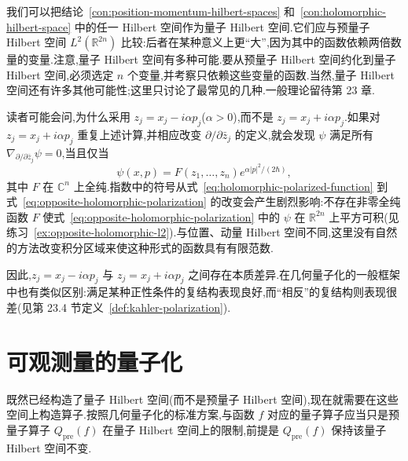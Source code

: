 我们可以把结论~\ref{con:position-momentum-hilbert-spaces} 和~\ref{con:holomorphic-hilbert-space} 中的任一 Hilbert 空间作为量子 Hilbert 空间.它们应与预量子 Hilbert 空间 $L^2(\mathbb R^{2n})$ 比较:后者在某种意义上更“大”,因为其中的函数依赖两倍数量的变量.注意,量子 Hilbert 空间有多种可能.要从预量子 Hilbert 空间约化到量子 Hilbert 空间,必须选定 $n$ 个变量,并考察只依赖这些变量的函数.当然,量子 Hilbert 空间还有许多其他可能性;这里只讨论了最常见的几种.一般理论留待第 23 章.

读者可能会问,为什么采用 $z_j=x_j-i\alpha p_j$($\alpha>0$),而不是 $z_j=x_j+i\alpha p_j$.如果对 $z_j=x_j+i\alpha p_j$ 重复上述计算,并相应改变 $\partial/\partial\bar z_j$ 的定义,就会发现 $\psi$ 满足所有 $\nabla_{\partial/\partial\bar z_j}\psi=0$,当且仅当
\[
 \psi(x,p)=F(z_1,\ldots,z_n)e^{\alpha|p|^2/(2\hbar)},
 \label{eq:opposite-holomorphic-polarization}
\]
其中 $F$ 在 $\mathbb C^n$ 上全纯.指数中的符号从式~\eqref{eq:holomorphic-polarized-function} 到式~\eqref{eq:opposite-holomorphic-polarization} 的改变会产生剧烈影响:不存在非零全纯函数 $F$ 使式~\eqref{eq:opposite-holomorphic-polarization} 中的 $\psi$ 在 $\mathbb R^{2n}$ 上平方可积(见练习~\ref{ex:opposite-holomorphic-l2}).与位置、动量 Hilbert 空间不同,这里没有自然的方法改变积分区域来使这种形式的函数具有有限范数.

因此,$z_j=x_j-i\alpha p_j$ 与 $z_j=x_j+i\alpha p_j$ 之间存在本质差异.在几何量子化的一般框架中也有类似区别:满足某种正性条件的复结构表现良好,而“相反”的复结构则表现很差(见第 23.4 节定义~\ref{def:kahler-polarization}).

\section{可观测量的量子化}
\label{sec:quantization-of-observables-euclidean}

既然已经构造了量子 Hilbert 空间(而不是预量子 Hilbert 空间),现在就需要在这些空间上构造算子.按照几何量子化的标准方案,与函数 $f$ 对应的量子算子应当只是预量子算子 $Q_{\mathrm{pre}}(f)$ 在量子 Hilbert 空间上的限制,前提是 $Q_{\mathrm{pre}}(f)$ 保持该量子 Hilbert 空间不变.

